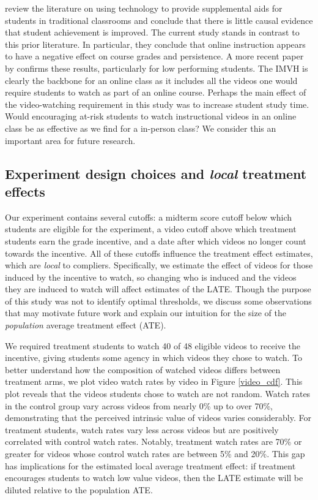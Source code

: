 \documentclass[12pt]{article}
\begin{document}
\textcite{aws2015} review the literature on using technology to provide supplemental aids for students in traditional classrooms and conclude that there is little causal evidence that student achievement is improved. The current study stands in contrast to this prior literature. In particular, they conclude that online instruction appears to have a negative effect on course grades and persistence. A more recent paper by \textcite{bflt2017} confirms these results, particularly for low performing students. The IMVH is clearly the backbone for an online class as it includes all the videos one would require students to watch as part of an online course. Perhaps the main effect of the video-watching requirement in this study was to increase student study time. Would encouraging at-risk students to watch instructional videos in an online class be as effective as we find for a in-person class? We consider this an important area for future research.

\subsection{Experiment design choices and \textit{local} treatment effects} \label{lates_section}

Our experiment contains several cutoffs: a midterm score cutoff below which students are eligible for the experiment, a video cutoff above which treatment students earn the grade incentive, and a date after which videos no longer count towards the incentive. All of these cutoffs influence the treatment effect estimates, which are \textit{local} to compliers. Specifically, we estimate the effect of videos for those induced by the incentive to watch, so changing who is induced and the videos they are induced to watch will affect estimates of the LATE. Though the purpose of this study was not to identify optimal thresholds, we discuss some observations that may motivate future work and explain our intuition for the size of the \textit{population} average treatment effect (ATE).

We required treatment students to watch 40 of 48 eligible videos to receive the incentive, giving students some agency in which videos they chose to watch. To better understand how the composition of watched videos differs between treatment arms, we plot video watch rates by video in Figure \ref{video_cdf}. This plot reveals that the videos students chose to watch are not random. Watch rates in the control group vary across videos from nearly 0\% up to over 70\%, demonstrating that the perceived intrinsic value of videos varies considerably. For treatment students, watch rates vary less across videos but are positively correlated with control watch rates. Notably, treatment watch rates are 70\% or greater for videos whose control watch rates are between 5\% and 20\%. This gap has implications for the estimated local average treatment effect: if treatment encourages students to watch low value videos, then the LATE estimate will be diluted relative to the population ATE.
\end{document}
